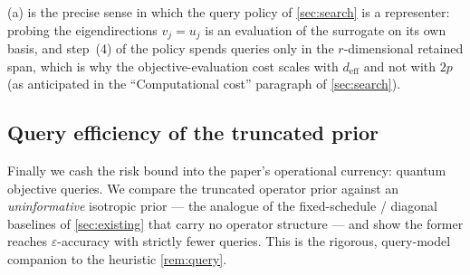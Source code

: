 \documentclass[aps,prxquantum,reprint,amsmath,amssymb,floatfix,nofootinbib,superscriptaddress,longbibliography]{revtex4-2}
\theoremstyle{remark}
\begin{document}
(a) is the precise sense in which the query policy of
\cref{sec:search} is a representer: probing the eigendirections
\(v_j=u_j\) is an evaluation of the surrogate on its own basis, and step~(4) of
the policy spends queries only in the \(r\)-dimensional retained span, which is
why the objective-evaluation cost scales with \(d_{\mathrm{eff}}\) and not with
\(2p\) (as anticipated in the ``Computational cost'' paragraph of
\cref{sec:search}).

\subsection{Query efficiency of the truncated prior}
\label{sec:queryeff}

Finally we cash the risk bound into the paper's operational currency: quantum
objective queries. We compare the truncated operator prior against an
\emph{uninformative} isotropic prior --- the analogue of the fixed-schedule /
diagonal baselines of \cref{sec:existing} that carry no operator structure --- and
show the former reaches \(\varepsilon\)-accuracy with strictly fewer queries. This
is the rigorous, query-model companion to the heuristic \cref{rem:query}.
\end{document}

